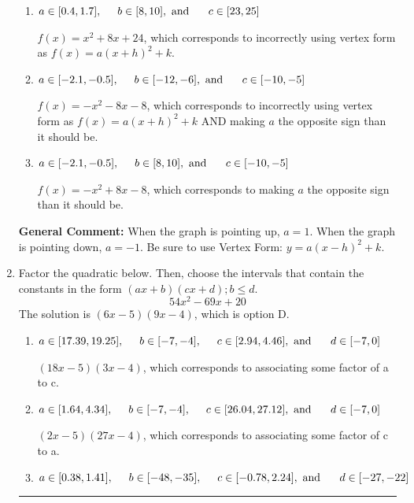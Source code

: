 \documentclass{extbook}[14pt]
\newcommand{\litem}[1]{\item #1

\rule{\textwidth}{0.4pt}}
\begin{document}
\begin{enumerate}
{\begin{enumerate}[label=\Alph*.]
* $f(x)=x^{2} -8 x + 24$, which is the correct option.
\item \( a \in [0.4, 1.7], \hspace*{5mm} b \in [8, 10], \text{ and } \hspace*{5mm} c \in [23, 25] \)

$f(x)=x^{2} +8 x + 24$, which corresponds to incorrectly using vertex form as $f(x) = a(x+h)^2+k$.
\item \( a \in [-2.1, -0.5], \hspace*{5mm} b \in [-12, -6], \text{ and } \hspace*{5mm} c \in [-10, -5] \)

$f(x)=-x^{2} -8 x -8$, which corresponds to incorrectly using vertex form as $f(x) = a(x+h)^2+k$ AND making $a$ the opposite sign than it should be.
\item \( a \in [-2.1, -0.5], \hspace*{5mm} b \in [8, 10], \text{ and } \hspace*{5mm} c \in [-10, -5] \)

$f(x)=-x^{2} +8 x -8$, which corresponds to making $a$ the opposite sign than it should be.
\end{enumerate}

\textbf{General Comment:} When the graph is pointing up, $a=1$. When the graph is pointing down, $a=-1$. Be sure to use Vertex Form: $y = a(x-h)^2+k$.
}
\litem{
Factor the quadratic below. Then, choose the intervals that contain the constants in the form $(ax+b)(cx+d); b \leq d.$
\[ 54x^{2} -69 x + 20 \]The solution is \( (6x -5)(9x -4) \), which is option D.\begin{enumerate}[label=\Alph*.]
\item \( a \in [17.39, 19.25], \hspace*{5mm} b \in [-7, -4], \hspace*{5mm} c \in [2.94, 4.46], \text{ and } \hspace*{5mm} d \in [-7, 0] \)

 $(18x -5)(3x -4)$, which corresponds to associating some factor of a to c.
\item \( a \in [1.64, 4.34], \hspace*{5mm} b \in [-7, -4], \hspace*{5mm} c \in [26.04, 27.12], \text{ and } \hspace*{5mm} d \in [-7, 0] \)

 $(2x -5)(27x -4)$, which corresponds to associating some factor of c to a.
\item \( a \in [0.38, 1.41], \hspace*{5mm} b \in [-48, -35], \hspace*{5mm} c \in [-0.78, 2.24], \text{ and } \hspace*{5mm} d \in [-27, -22] \)


\end{enumerate}}
\end{enumerate}
\end{document}
